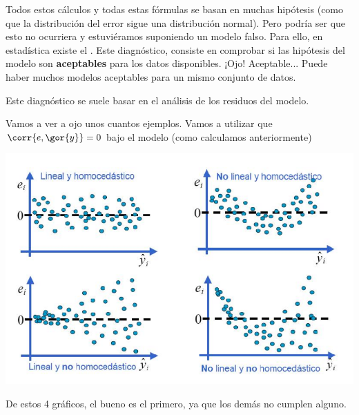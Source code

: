 \obs Todos estos cálculos y todas estas fórmulas se basan en muchas hipótesis (como que la distribución del error sigue una distribución normal). Pero podría ser que esto no ocurriera y estuviéramos suponiendo un modelo falso. Para ello, en estadística existe el . Este diagnóstico, consiste en comprobar si las hipótesis del modelo son \textbf{aceptables} para los datos disponibles. ¡Ojo! Aceptable... Puede haber muchos modelos aceptables para un mismo conjunto de datos.

Este diagnóstico se suele basar en el análisis de los residuos del modelo.

\begin{example}
	Vamos a ver a ojo unos cuantos ejemplos. Vamos a utilizar que $\corr{e,\gor{y}} = 0$ bajo el modelo (como calculamos anteriormente)

\begin{center}
\includegraphics[scale=0.5]{img/diagmodelo.png}
\end{center}

De estos 4 gráficos, el bueno es el primero, ya que los demás no cumplen alguno.
\end{example}

